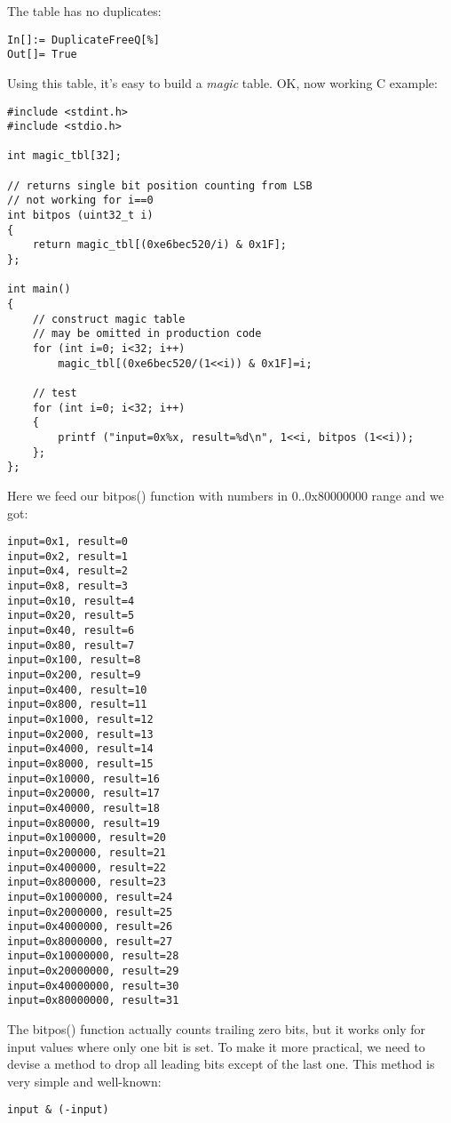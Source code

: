 The table has no duplicates:

\begin{lstlisting}
In[]:= DuplicateFreeQ[%]
Out[]= True
\end{lstlisting}

Using this table, it's easy to build a \textit{magic} table.
OK, now working C example:

\begin{lstlisting}[style=customc]
#include <stdint.h>
#include <stdio.h>

int magic_tbl[32];

// returns single bit position counting from LSB
// not working for i==0
int bitpos (uint32_t i)
{
	return magic_tbl[(0xe6bec520/i) & 0x1F];
};

int main()
{
	// construct magic table
	// may be omitted in production code
	for (int i=0; i<32; i++)
		magic_tbl[(0xe6bec520/(1<<i)) & 0x1F]=i;

	// test
	for (int i=0; i<32; i++)
	{
		printf ("input=0x%x, result=%d\n", 1<<i, bitpos (1<<i));
	};
};
\end{lstlisting}

Here we feed our bitpos() function with numbers in 0..0x80000000 range and we got:

\begin{lstlisting}
input=0x1, result=0
input=0x2, result=1
input=0x4, result=2
input=0x8, result=3
input=0x10, result=4
input=0x20, result=5
input=0x40, result=6
input=0x80, result=7
input=0x100, result=8
input=0x200, result=9
input=0x400, result=10
input=0x800, result=11
input=0x1000, result=12
input=0x2000, result=13
input=0x4000, result=14
input=0x8000, result=15
input=0x10000, result=16
input=0x20000, result=17
input=0x40000, result=18
input=0x80000, result=19
input=0x100000, result=20
input=0x200000, result=21
input=0x400000, result=22
input=0x800000, result=23
input=0x1000000, result=24
input=0x2000000, result=25
input=0x4000000, result=26
input=0x8000000, result=27
input=0x10000000, result=28
input=0x20000000, result=29
input=0x40000000, result=30
input=0x80000000, result=31
\end{lstlisting}

The bitpos() function actually counts trailing zero bits, but it works only for input values where only one bit is set.
To make it more practical, we need to devise a method to drop all leading bits except of the last one.
This method is very simple and well-known:

\begin{lstlisting}
input & (-input)
\end{lstlisting}

